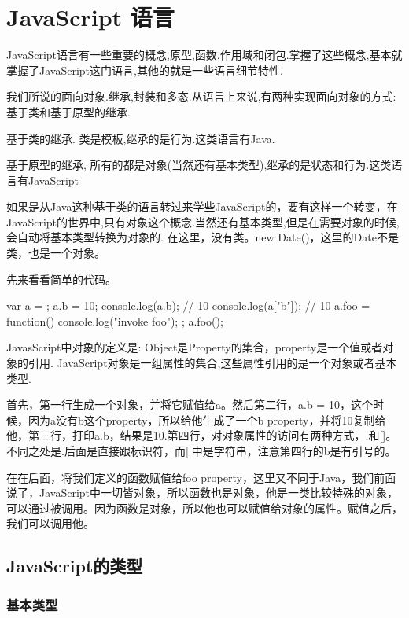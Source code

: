 \renewcommand\lstlistingname{Mocha}  
\chapter{JavaScript 语言}

JavaScript语言有一些重要的概念,原型,函数,作用域和闭包.掌握了这些概念,基本就掌握了JavaScript这门语言,其他的就是一些语言细节特性.

我们所说的面向对象.继承,封装和多态.从语言上来说,有两种实现面向对象的方式:基于类和基于原型的继承.

基于类的继承. 类是模板,继承的是行为.这类语言有Java.
	
基于原型的继承, 所有的都是对象(当然还有基本类型),继承的是状态和行为.这类语言有JavaScript

如果是从Java这种基于类的语言转过来学些JavaScript的，要有这样一个转变，在JavaScript的世界中,只有对象这个概念.当然还有基本类型,但是在需要对象的时候,会自动将基本类型转换为对象的. 在这里，没有类。new Date()，这里的Date不是类，也是一个对象。

先来看看简单的代码。
	
\begin{JavaScript}
var a = {};	
a.b = 10;
console.log(a.b); // 10
console.log(a["b"]); // 10
a.foo = function() {
	console.log("invoke foo");
};
a.foo();
\end{JavaScript}

JavasScript中对象的定义是: Object是Property的集合，property是一个值或者对象的引用. JavaScript对象是一组属性的集合,这些属性引用的是一个对象或者基本类型.
	
首先，第一行生成一个对象，并将它赋值给a。然后第二行，a.b = 10，这个时候，因为a没有b这个property，所以给他生成了一个b property，并将10复制给他，第三行，打印a.b，结果是10.第四行，对对象属性的访问有两种方式，.和[]。不同之处是.后面是直接跟标识符，而[]中是字符串，注意第四行的b是有引号的。
	
在在后面，将我们定义的函数赋值给foo property，这里又不同于Java，我们前面说了，JavaScript中一切皆对象，所以函数也是对象，他是一类比较特殊的对象，可以通过被调用。因为函数是对象，所以他也可以赋值给对象的属性。赋值之后，我们可以调用他。
	
\section{JavaScript的类型}

\subsection{基本类型}

